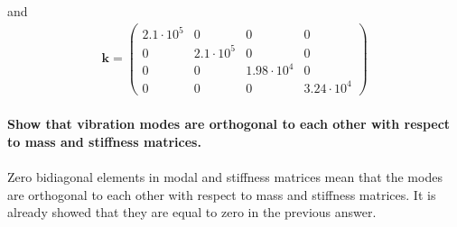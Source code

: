 \documentclass[]{report}
\begin{document}
and
\begin{eqnarray*}
\mathbf{k}=\left(\begin{array}{cccc} 2.1\cdot 10^5 & 0 & 0 & 0\\ 0 & 2.1\cdot 10^5 & 0 & 0\\ 0 & 0 & 1.98\cdot 10^4 & 0\\ 0 & 0 & 0 & 3.24\cdot 10^4 \end{array}\right)
\end{eqnarray*}
\newpage
~\\
\textbf{Show that vibration modes are orthogonal to each other with respect to mass and stiffness matrices.}
\\~\\
Zero bidiagonal elements in modal and stiffness matrices mean that the modes are orthogonal to each other with respect to mass and stiffness matrices. It is already showed that they are equal to zero in the previous answer.
\end{document}

